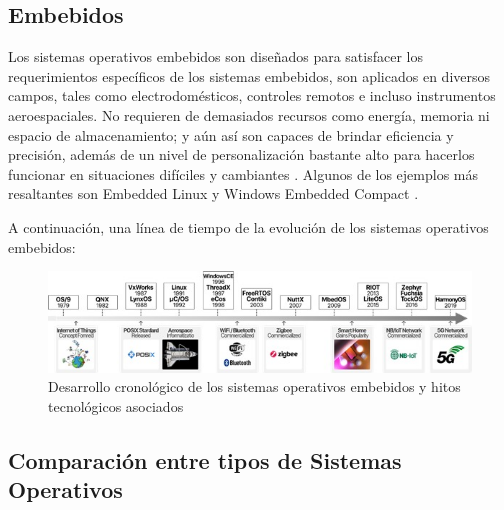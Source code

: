 \subsection{Embebidos}
Los sistemas operativos embebidos son diseñados para satisfacer los requerimientos específicos de los sistemas embebidos, son aplicados en diversos campos, tales como electrodomésticos, controles remotos e incluso instrumentos aeroespaciales. No requieren de demasiados recursos como energía, memoria ni espacio de almacenamiento; y aún así son capaces de brindar eficiencia y precisión, además de un nivel de personalización bastante alto para hacerlos funcionar en situaciones difíciles y cambiantes \citep{jia2024acos}. Algunos de los ejemplos más resaltantes son Embedded Linux y Windows Embedded Compact \citep{rawat2025osstudy}.  

A continuación, una línea de tiempo de la evolución de los sistemas operativos embebidos:  

\begin{figure}[H]
    \centering
    \includegraphics[width=1.0\textwidth]{figures/timeLineEmbeded.jpg}
    \caption[Desarrollo cronológico de los sistemas operativos embebidos y hitos tecnológicos asociados]
            {Desarrollo cronológico de los sistemas operativos embebidos y hitos tecnológicos asociados \citep{jia2024acos}}
    \label{fig:Embedded_os}
\end{figure} 

\subsection{Comparación entre tipos de Sistemas Operativos}

